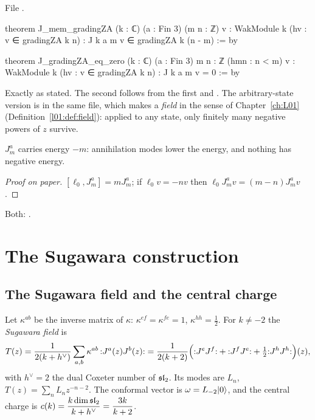 \noindent File .
\begin{leancode}
theorem J_mem_gradingZA (k : ℂ) (a : Fin 3) (m n : ℤ) {v : WakModule k}
    (hv : v ∈ gradingZA k n) : J k a m v ∈ gradingZA k (n - m) := by

theorem J_gradingZA_eq_zero (k : ℂ) (a : Fin 3) {m n : ℤ} (hmn : n < m) {v : WakModule k}
    (hv : v ∈ gradingZA k n) : J k a m v = 0 := by
\end{leancode}

\begin{dictionary}
Exactly as stated. The second follows from the first and . The arbitrary-state
version is  in the same file, which makes  a \emph{field} in the
sense of Chapter~\ref{ch:L01} (Definition~\ref{l01:def:field}): applied to any state, only finitely many
negative powers of $z$ survive.
\end{dictionary}

\begin{physics}
$J^a_m$ carries energy $-m$: annihilation modes lower the energy, and nothing has negative energy.
\end{physics}

\begin{proof}[Proof on paper]
$[\ell_0,J^a_m] = mJ^a_m$; if $\ell_0v=-nv$ then $\ell_0J^a_mv = (m-n)J^a_mv$.
\end{proof}

\begin{status}
Both: \lean{[propext, Classical.}\allowbreak{}\allowbreak\lean{sound]}.
\end{status}
\section{The Sugawara construction}\label{l08:sec:sugawara}

\subsection{The Sugawara field and the central charge}

\begin{definition}\label{l08:def:sugawara}
Let $\kappa^{ab}$ be the inverse matrix of $\kappa$: $\kappa^{ef}=\kappa^{fe}=1$, $\kappa^{hh}=\frac12$.
For $k\ne-2$ the \emph{Sugawara field} is
\begin{equation}\label{l08:eq:sugawara}
  T(z) = \frac{1}{2(k+h^\vee)}\sum_{a,b}\kappa^{ab}\,{:}J^a(z)J^b(z){:}
  = \frac{1}{2(k+2)}\Bigl({:}J^eJ^f{:}+{:}J^fJ^e{:}+\tfrac12{:}J^hJ^h{:}\Bigr)(z),
\end{equation}
with $h^\vee = 2$ the dual Coxeter number of $\mathfrak{sl}_2$. Its modes are $L_n$, $T(z) = \sum_nL_nz^{-n-2}$.
The conformal vector is $\omega = L_{-2}|0\rangle$, and the central charge is
$c(k) = \dfrac{k\dim\mathfrak{sl}_2}{k+h^\vee} = \dfrac{3k}{k+2}$.
\end{definition}

